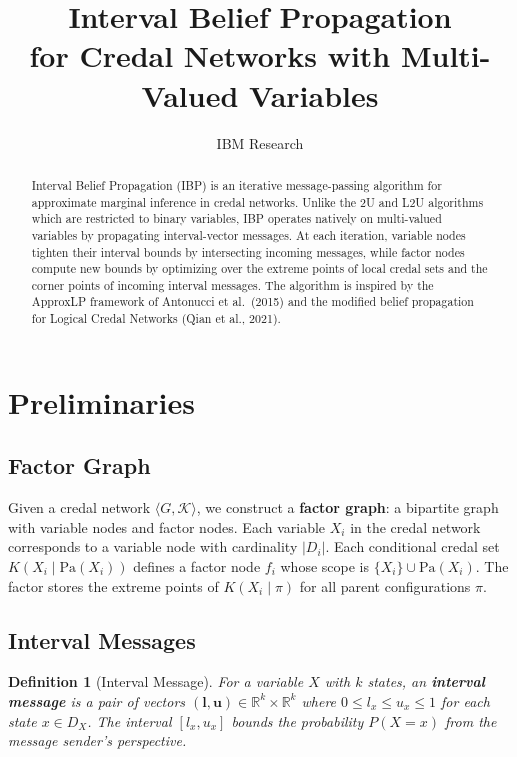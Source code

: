\documentclass[11pt]{article}
\title{Interval Belief Propagation\\for Credal Networks with Multi-Valued Variables}
\author{IBM Research}
\date{}
\newtheorem{definition}{Definition}
\begin{document}
\maketitle

\begin{abstract}
Interval Belief Propagation (IBP) is an iterative message-passing algorithm for
approximate marginal inference in credal networks. Unlike the 2U and L2U algorithms
which are restricted to binary variables, IBP operates natively on multi-valued
variables by propagating interval-vector messages. At each iteration, variable nodes
tighten their interval bounds by intersecting incoming messages, while factor nodes
compute new bounds by optimizing over the extreme points of local credal sets and the
corner points of incoming interval messages. The algorithm is inspired by the ApproxLP
framework of Antonucci et al.\ (2015) and the modified belief propagation for Logical
Credal Networks (Qian et al., 2021).
\end{abstract}

\section{Preliminaries}

\subsection{Factor Graph}

Given a credal network $\langle G, \mathcal{K} \rangle$, we construct a
\textbf{factor graph}: a bipartite graph with variable nodes and factor nodes.
Each variable $X_i$ in the credal network corresponds to a variable node with
cardinality $|D_i|$. Each conditional credal set $K(X_i \mid \mathrm{Pa}(X_i))$
defines a factor node $f_i$ whose scope is $\{X_i\} \cup \mathrm{Pa}(X_i)$.
The factor stores the extreme points of $K(X_i \mid \pi)$ for all parent
configurations $\pi$.

\subsection{Interval Messages}

\begin{definition}[Interval Message]
For a variable $X$ with $k$ states, an \textbf{interval message} is a pair of
vectors $(\mathbf{l}, \mathbf{u}) \in \mathbb{R}^k \times \mathbb{R}^k$ where
$0 \leq l_x \leq u_x \leq 1$ for each state $x \in D_X$. The interval
$[l_x, u_x]$ bounds the probability $P(X = x)$ from the message sender's
perspective.
\end{definition}
\end{document}
